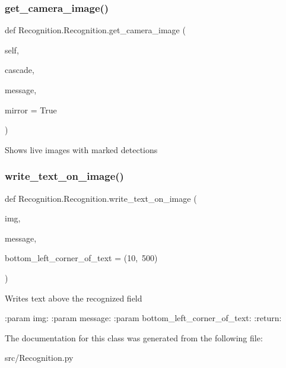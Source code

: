 \subsubsection{\texorpdfstring{get\+\_\+camera\+\_\+image()}{get\_camera\_image()}}
{\footnotesize\ttfamily def Recognition.\+Recognition.\+get\+\_\+camera\+\_\+image (\begin{DoxyParamCaption}\item[{}]{self,  }\item[{}]{cascade,  }\item[{}]{message,  }\item[{}]{mirror = {\ttfamily True} }\end{DoxyParamCaption})}

\begin{DoxyVerb}Shows live images with marked detections
\end{DoxyVerb}
 \mbox{\label{class_recognition_1_1_recognition_a5b3081b9a48c136f1397cd17dce89c37}} 
\subsubsection{\texorpdfstring{write\+\_\+text\+\_\+on\+\_\+image()}{write\_text\_on\_image()}}
{\footnotesize\ttfamily def Recognition.\+Recognition.\+write\+\_\+text\+\_\+on\+\_\+image (\begin{DoxyParamCaption}\item[{}]{img,  }\item[{}]{message,  }\item[{}]{bottom\+\_\+left\+\_\+corner\+\_\+of\+\_\+text = {\ttfamily (10,~500)} }\end{DoxyParamCaption})\hspace{0.3cm}{\ttfamily [static]}}

\begin{DoxyVerb}Writes text above the recognized field

:param img:
:param message:
:param bottom_left_corner_of_text:
:return:
\end{DoxyVerb}
 

The documentation for this class was generated from the following file\+:\begin{DoxyCompactItemize}
\item 
src/Recognition.\+py\end{DoxyCompactItemize}
